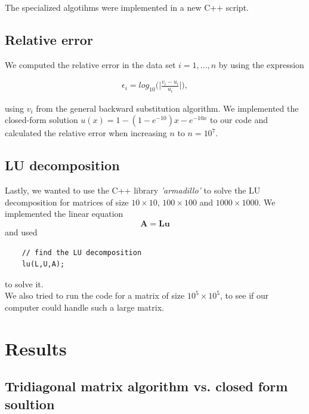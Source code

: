 \documentclass[12pt]{article}
\renewcommand{\vec}[1]{\mathbf{#1}}
\begin{document}
\noindent The specialized algotihms were implemented in a new C++ script.

\newpage

\subsection{Relative error}
\noindent We computed the relative error in the data set $i = 1,...,n$ by using the expression

\begin{align*}
    \epsilon_i = log_{10} \Big( \Big| \frac{v_i - u_i}{u_i}  \Big| \Big),
\end{align*}

\noindent using $v_i$ from the general backward substitution algorithm. We implemented the closed-form solution $u(x) = 1 - (1 - e^{-10})x - e^{-10x}$ to our code and calculated the relative error when increasing $n$ to $n = 10^7$.


\subsection{LU decomposition}

\noindent Lastly, we wanted to use the C++ library \textit{'armadillo'} to solve the LU decomposition for matrices of size $10 \times 10$, $100 \times 100$ and $1000 \times 1000$. We implemented the linear equation $$\vec{A} = \vec{L} \vec{u}$$ and used

\begin{lstlisting}
    // find the LU decomposition
    lu(L,U,A);
\end{lstlisting}

\noindent to solve it.\\

\noindent We also tried to run the code for a matrix of size $10^5 \times 10^5$, to see if our computer could handle such a large matrix.



\section{Results}


\subsection{Tridiagonal matrix algorithm vs. closed form soultion}
\end{document}
